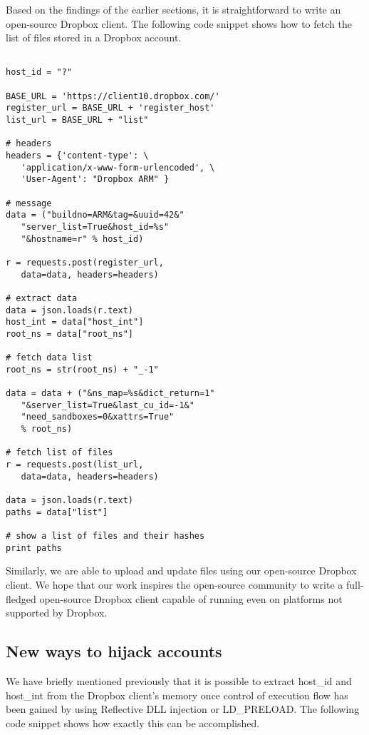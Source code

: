 \documentclass[letterpaper,twocolumn,10pt]{article}
\begin{document}
Based on the findings of the earlier sections, it is straightforward to write
an open-source Dropbox client. The following code snippet shows how to fetch
the list of files stored in a Dropbox account.

\begin{verbatim}

host_id = "?"

BASE_URL = 'https://client10.dropbox.com/'
register_url = BASE_URL + 'register_host'
list_url = BASE_URL + "list"

# headers
headers = {'content-type': \
   'application/x-www-form-urlencoded', \
   'User-Agent': "Dropbox ARM" }

# message
data = ("buildno=ARM&tag=&uuid=42&"
   "server_list=True&host_id=%s"
   "&hostname=r" % host_id)

r = requests.post(register_url,
   data=data, headers=headers)

# extract data
data = json.loads(r.text)
host_int = data["host_int"]
root_ns = data["root_ns"]

# fetch data list
root_ns = str(root_ns) + "_-1"

data = data + ("&ns_map=%s&dict_return=1"
   "&server_list=True&last_cu_id=-1&"
   "need_sandboxes=0&xattrs=True"
   % root_ns)

# fetch list of files
r = requests.post(list_url,
   data=data, headers=headers)

data = json.loads(r.text)
paths = data["list"]

# show a list of files and their hashes
print paths

\end{verbatim}

Similarly, we are able to upload and update files using our open-source Dropbox
client. We hope that our work inspires the open-source community to write a
full-fledged open-source Dropbox client capable of running even on platforms
not supported by Dropbox.

\subsection{New ways to hijack accounts}

We have briefly mentioned previously that it is possible to extract host\_id
and host\_int from the Dropbox client's memory once control of execution flow
has been gained by using Reflective DLL injection or LD\_PRELOAD. The following
code snippet shows how exactly this can be accomplished.
\end{document}
